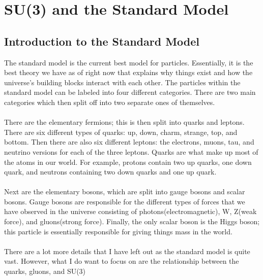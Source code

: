 \documentclass[12pt,journal,compsoc]{IEEEtran}
\begin{document}
\section{SU(3) and the Standard Model}
\subsection{Introduction to the Standard Model}
The standard model is the current best model for particles. Essentially, it is the best theory we have as of right now that explains why things exist and how the universe's building blocks interact with each other. The particles within the standard model can be labeled into four different categories. There are two main categories which then split off into two separate ones of themselves. \\\\
There are the elementary fermions; this is then split into quarks and leptons. There are six different types of quarks: up, down, charm, strange, top, and bottom. Then there are also six different leptons: the electrons, muons, tau, and neutrino versions for each of the three leptons. Quarks are what make up most of the atoms in our world. For example, protons contain two up quarks, one down quark, and neutrons containing two down quarks and one up quark.\\\\
Next are the elementary bosons, which are split into gauge bosons and scalar bosons. Gauge bosons are responsible for the different types of forces that we have observed in the universe consisting of photons(electromagnetic), W, Z(weak force), and gluons(strong force). Finally, the only scalar boson is the Higgs boson; this particle is essentially responsible for giving things mass in the world.\\\\
There are a lot more details that I have left out as the standard model is quite vast. However, what I do want to focus on are the relationship between the quarks, gluons, and SU(3)
\end{document}
